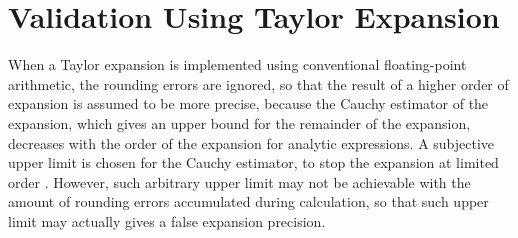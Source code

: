 \documentclass[twoside]{article}
\numberwithin{equation}{section}
\begin{document}
\clearpage
\section{Validation Using Taylor Expansion}
\label{sec: taylor expansion}

When a Taylor expansion is implemented using conventional floating-point arithmetic, the rounding errors are ignored, so that the result of a higher order of expansion is assumed to be more precise, because the Cauchy estimator of the expansion, which gives an upper bound for the remainder of the expansion, decreases with the order of the expansion for analytic expressions.  A subjective upper limit is chosen for the Cauchy estimator, to stop the expansion at limited order \cite{Numerical_Recipes}.  However, such arbitrary upper limit may not be achievable with the amount of rounding errors accumulated during calculation, so that such upper limit may actually gives a false expansion precision.   
\end{document}
